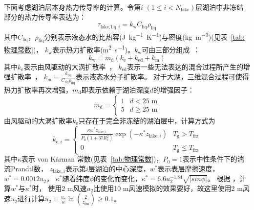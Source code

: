 下面考虑湖泊层本身热力传导率的计算。令第$i$ $\left(1\leqslant i<N_{\mathrm{lake}}\right)$层湖泊中非冻结部分的热力传导率表达为：
\begin{equation}
  \tau_{\mathrm{lake,liq},i}=k_{\mathrm{w}} C_{\mathrm{liq}} \rho_{\mathrm{liq}}
\end{equation}
其中$C_{\mathrm{liq}}$，$\rho_{\mathrm{liq}}$分别表示液态水的比热容(\unit{J.kg^{-1}.K^{-1}})与密度(\unit{kg.m^{-3}})(见表~\ref{tab:物理常数})，
$k_{\mathrm {w}} $表示热力扩散率(\unit{m^2.s^{-1}})。$k_{\mathrm {w}} $可由三部分组成~\citep{subin2012improved}：
\begin{equation}
  k_{\mathrm{w}}=m_{\mathrm{d}}\left(k_{\mathrm{e}}+k_{\mathrm{ed}}+k_{\mathrm{m}}\right)
\end{equation}
其中$k_{\mathrm {e}} $表示由风驱动的大涡扩散率~\citep{hostetler1990simulation}，
$k_{\mathrm{ed}}$表示一些无法表达的混合过程所产生的增强扩散率~\citep{fang1996long}，
$k_{\mathrm {m}} =\frac{k_{\mathrm {liq}}}{C_{\mathrm{liq}}\rho_{\mathrm{liq}}}$表示液态水分子扩散率。
对于大湖，三维混合过程可使得热力扩散率再次增强，$m_{\mathrm {d}} $即表示依赖于湖泊深度$d$的增强因子：
\begin{equation}
  m_{\mathrm{d}}=\left\{\begin{array}{ll}1 & d<25 \text{ m} \\ 5 & d \geqslant 25 \text{ m}\end{array}\right.
\end{equation}
由风驱动的大涡扩散率$k_{\mathrm {e}} $只存在于完全非冻结的湖泊层中，计算方式为
\begin{equation}
  k_{\mathrm{e},i}=\begin{cases}
    \frac{\kappa w^\ast z_{\mathrm{lake},i}}{P_{0}\left(1+37 R_{i}^{2}\right)}
    \exp \left(-\kappa^{*} z_{\mathrm{lake},i}\right) & T_{\mathrm{g}}>T_{\mathrm {frz}} \\
    0 & T_{\mathrm{g}} \leqslant T_{\mathrm {frz}}
  \end{cases}
\end{equation}
其中$\kappa$表示 von K\'arman 常数(见表~\ref{tab:物理常数})，$P_0=1$表示中性条件下的湍流${\mathrm {Prandtl}}$数，
$z_{\mathrm{lake},i}$表示第$i$层湖泊的中心深度，$w^\ast$表示表层摩擦速度，$w^\ast=0.0012u_2$，
$\kappa^\ast$随着纬度$\phi$的变化而变化，$\kappa^\ast=6.6u_2^{-1.84}\sqrt{\left|sin\phi\right|}$。
根据 \citet{hostetler1990simulation}，计算$w^\ast$与$\kappa^\ast$时，
使用2 m风速$u_2$比使用10 m风速模拟的效果要好，故这里使用2 m风速$u_2$进行计算$u_2=\frac{u_\ast}{\kappa}\ln{\left(\frac{2}{z_{\mathrm{0m}}}\right)}\geqslant 0.1$。
